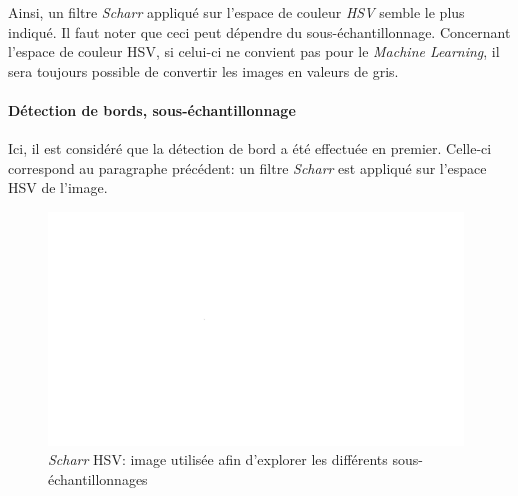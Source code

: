 Ainsi, un filtre \textit{Scharr} appliqué sur l'espace de couleur \textit{HSV} semble le plus indiqué. Il faut noter que ceci peut dépendre du sous-échantillonnage. Concernant l'espace de couleur HSV, si celui-ci ne convient pas pour le \textit{Machine Learning}, il sera toujours possible de convertir les images en valeurs de gris.

\paragraph{Détection de bords, sous-échantillonnage}
Ici, il est considéré que la détection de bord a été effectuée en premier. Celle-ci correspond au paragraphe précédent: un filtre \textit{Scharr} est appliqué sur l'espace HSV de l'image.

\begin{figure}[H]
    \includegraphics[width=110mm]{img/conception/image_process/edges_only/5.png}
    \centering
    \caption{\textit{Scharr} HSV: image utilisée afin d'explorer les différents sous-échantillonnages}
    \label{fig:image_process_edge_down_orig}
\end{figure}

